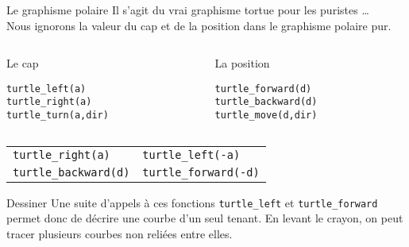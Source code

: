 \documentclass[10pt]{beamer}
\begin{document}
\begin{frame}[fragile]{Le graphisme polaire}
Il s'agit du vrai graphisme tortue pour les puristes \dots\\
Nous ignorons la valeur du cap et de la position dans le graphisme polaire pur.

\begin{columns}[t]
\begin{column}{0.48\textwidth}
  \begin{block}{Le cap}
    \begin{lstlisting}[style=edblock]
turtle_left(a)
turtle_right(a)
turtle_turn(a,dir)
    \end{lstlisting}
  \end{block}
\end{column}
\begin{column}{0.48\textwidth}
  \begin{block}{La position}
    \begin{lstlisting}[style=edblock]
turtle_forward(d)
turtle_backward(d)
turtle_move(d,dir)
    \end{lstlisting}
  \end{block}
\end{column}
\end{columns}

\begin{center}
\begin{tabular}{l@{ $\Leftrightarrow$ }l}
  \toprule
  \lstinline!turtle_right(a)! & \lstinline!turtle_left(-a)! \\
  \lstinline!turtle_backward(d)! & \lstinline!turtle_forward(-d)! \\
  \bottomrule
\end{tabular}
\end{center}

\begin{block}{Dessiner}
Une suite d'appels à ces fonctions \texttt{turtle\_left} et \texttt{turtle\_forward} permet donc de décrire une courbe d'un seul tenant.
En levant le crayon, on peut tracer plusieurs courbes non reliées entre elles.
\end{block}
\end{frame}
\end{document}
